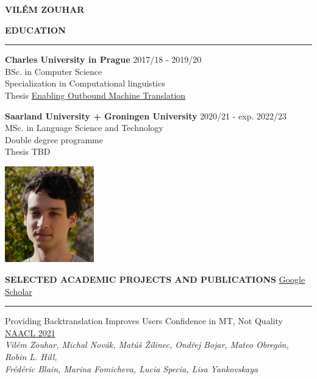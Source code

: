 \documentclass[11pt,a4paper]{article} %
\newcommand{\hSection}[1]{
    \medskip
    \MakeUppercase{\bf #1}
    \medskip
    \hrule
}
\newcommand{\hSectionI}[2]{
    \medskip
    \MakeUppercase{\bf #1}
    \hfill
    #2
    \medskip
    \hrule
}
\newcommand{\hSubsectionB}[3]{
    {#1} \hfill {\footnotesize #2}\hspace{-1cm}\\
    \vspace{-0.2cm} \hspace{-0.17cm}\textit{\footnotesize #3}
    \vspace{0.1cm}
}
\begin{document}
\begin{center}
    {\LARGE \bf VILÉM ZOUHAR} \\
    {\large \href{mailto:vilem.zouhar@gmail.com}{\color{black}{vilem.zouhar@gmail.com}}}
\end{center}

\vspace{\baselineskip}

\begin{minipage}{0.75\textwidth}
\hSection{Education}\vspace{0.2cm}
{\bf Charles University in Prague} \hfill {2017/18 - 2019/20} \\
BSc. in Computer Science \\
Specialization in Computational linguistics \\
Thesis \href{https://dspace.cuni.cz/bitstream/handle/20.500.11956/119400/130284419.pdf?sequence=1&isAllowed=y}{Enabling Outbound Machine Translation}

\vspace{\baselineskip}

{\bf Saarland University\hspace{-0.1cm} +\hspace{-0.1cm} Groningen University} \hfill {2020/21 - exp. 2022/23} \\
MSc. in Language Science and Technology \\
Double degree programme \\
Thesis TBD
\end{minipage}
\begin{minipage}{0.25\textwidth}
    \center
    \vspace{0.5cm}
    \hfill
    \includegraphics[width=3.85cm]{portrait.jpg}
\end{minipage}

\hSectionI{Selected Academic Projects and Publications}{\href{https://scholar.google.com/citations?user=2EUDwtkAAAAJ}{Google Scholar}\hspace{-1.12cm}}

\hSubsectionB
{Providing Backtranslation Improves Users Confidence in MT, Not Quality}
{\href{https://arxiv.org/pdf/2104.05688.pdf}{NAACL 2021}}
{Vilém Zouhar, Michal Novák, Matúš Žilinec, Ondřej Bojar, Mateo Obregón, Robin L. Hill,\\ Frédéric Blain, Marina Fomicheva, Lucia Specia, Lisa Yankovskaya}
\vspace{-0.11cm}
\end{document}
